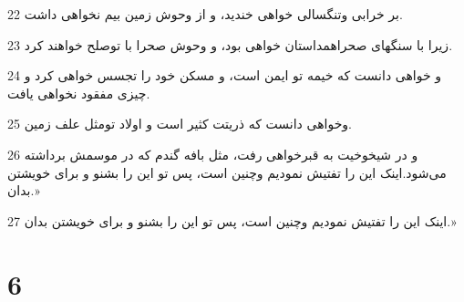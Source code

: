 \par 22 بر خرابی وتنگسالی خواهی خندید، و از وحوش زمین بیم نخواهی داشت.
\par 23 زیرا با سنگهای صحراهمداستان خواهی بود، و وحوش صحرا با توصلح خواهند کرد. 
\par 24 و خواهی دانست که خیمه تو ایمن است، و مسکن خود را تجسس خواهی کرد و چیزی مفقود نخواهی یافت.
\par 25 وخواهی دانست که ذریتت کثیر است و اولاد تومثل علف زمین.
\par 26 و در شیخوخیت به قبرخواهی رفت، مثل بافه گندم که در موسمش برداشته می‌شود.اینک این را تفتیش نمودیم وچنین است، پس تو این را بشنو و برای خویشتن بدان.»
\par 27 اینک این را تفتیش نمودیم وچنین است، پس تو این را بشنو و برای خویشتن بدان.»
 
\chapter{6}

